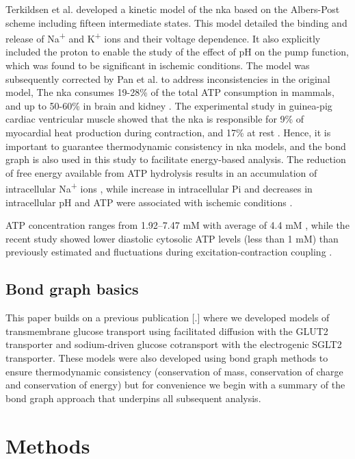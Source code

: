 \documentclass{biophys-new}
\begin{document}
Terkildsen et al. \cite{terkildsen_balance_2007} developed a kinetic model of the \Gls{nka} based on the Albers-Post scheme including fifteen intermediate states.
This model detailed the binding and release of Na\textsuperscript{+} and K\textsuperscript{+} ions and their voltage dependence.
It also explicitly included the proton to enable the study of the effect of pH on the pump function,
which was found to be significant in ischemic conditions.
The model was subsequently corrected by Pan et al. \cite{pan_cardiac_2020} to address inconsistencies in the original model,
The \Gls{nka} consumes 19-28\% of the total ATP consumption in mammals, and up to 50-60\% in brain and kidney \cite{rolfe_cellular_1997}.
The experimental study in guinea-pig cardiac ventricular muscle showed that the \Gls{nka} is responsible for 9\% of myocardial heat production during contraction,
and 17\% at rest \cite{schramm1994energy}.
Hence, it is important to guarantee thermodynamic consistency in \Gls{nka} models, and the bond graph is also used in this study to facilitate energy-based analysis.
The reduction of free energy available from ATP hydrolysis results in an accumulation of intracellular Na\textsuperscript{+} ions \cite{jansen2003energy},
while increase in intracellular Pi and decreases in intracellular pH and ATP were associated with ischemic conditions \cite{huang1984regulation}.

ATP concentration ranges from 1.92–7.47 mM with average of 4.4 mM \cite{greiner_intracellular_2021},
while the recent study showed lower diastolic cytosolic ATP levels (less than 1 mM) than previously estimated and fluctuations during excitation-contraction coupling \cite{rhana_fueling_2024}.

\subsection*{Bond graph basics}

This paper builds on a previous publication {[}.{]} where we developed
models of transmembrane glucose transport using facilitated diffusion
with the GLUT2 transporter and sodium-driven glucose cotransport with
the electrogenic SGLT2 transporter. These models were also developed
using bond graph methods to ensure thermodynamic consistency
(conservation of mass, conservation of charge and conservation of
energy) but for convenience we begin with a summary of the bond graph
approach that underpins all subsequent analysis.


\section*{Methods}
\end{document}
